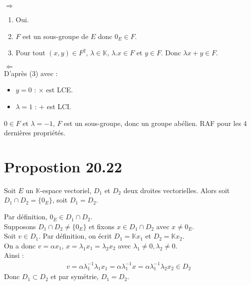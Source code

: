 \documentclass[../main.tex]{subfiles}
\begin{document}
$\boxed{\Rightarrow}$
\begin{enumerate}
    \item Oui. 
    \item $F$ est un sous-groupe de $E$ donc $0_E \in F$. 
    \item Pour tout $(x, y) \in F^2$, $\lambda \in \mathbb{K}$, $\lambda .x \in F$ et $y \in F$. Donc $\lambda x + y \in F$.
\end{enumerate}

$\boxed{\Leftarrow}$ \\
D'après (3) avec : 
\begin{itemize}
    \item $y = 0$ : $\times$ est LCE. 
    \item $\lambda = 1$ : $+$ est LCI. 
\end{itemize}
$0\in F$ et $\lambda = -1$, $F$ est un sous-groupe, donc un groupe abélien.
RAF pour les 4 dernières propriétés.

\section{Propostion 20.22}
\begin{tcolorbox}[title=Propostion 20.22, title filled=false, colframe=lightblue, colback=lightblue!10!white]
    Soit $E$ un $\mathbb{K}$-espace vectoriel, $D_1$ et $D_2$ deux droites vectorielles. Alors soit $D_1 \cap D_2 = \{ 0_E \}$, soit $D_1 = D_2$. 
\end{tcolorbox}

\noindent Par définition, $0_E \in D_1 \cap D_2$. \\
Supposons $D_1 \cap D_2 \neq \{ 0_E \}$ et fixons $x \in D_1 \cap D_2$ avec $x \neq 0_E$. \\
Soit $v\in D_1$. Par définition, on écrit $D_1 = \mathbb{K} x_1$ et $D_2 = \mathbb{K} x_2$. \\
On a donc $v = \alpha x_1$, $x = \lambda_1 x_1 = \lambda_2 x_2$ avec $\lambda_1 \neq 0, \lambda_2 \neq 0$. \\
Ainsi : 
\begin{align*}
    v = \alpha \lambda_1^{-1} \lambda_1 x_1 = \alpha \lambda_1^{-1} x = \alpha \lambda_1^{-1} \lambda_2 x_2 \in D_2
\end{align*}
Donc $D_1 \subset D_2$ et par symétrie, $\boxed{D_1 = D_2}$.
\end{document}
